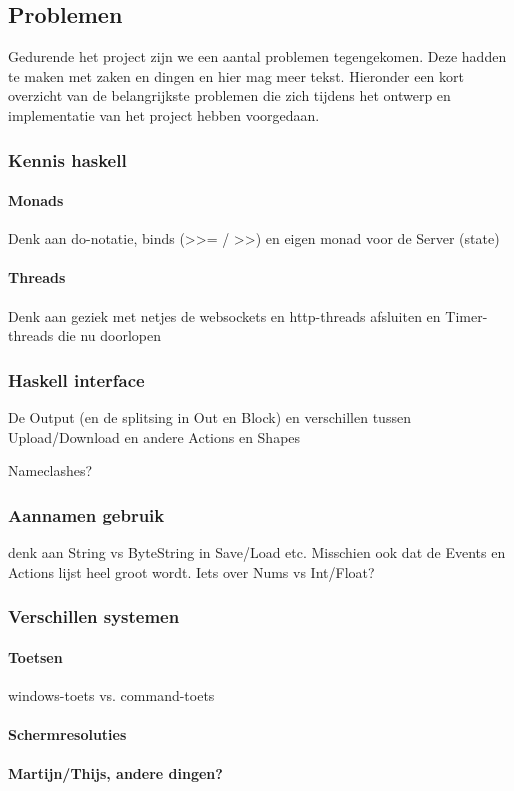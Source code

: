 \subsection{Problemen}

Gedurende het project zijn we een aantal problemen tegengekomen. Deze hadden te maken met zaken en dingen en hier mag meer tekst. Hieronder een kort overzicht van de belangrijkste problemen die zich tijdens het ontwerp en implementatie van het project hebben voorgedaan.

\subsubsection{Kennis haskell}

\paragraph{Monads}
Denk aan do-notatie, binds (>>= / >>) en eigen monad voor de Server (state)

\paragraph{Threads}
Denk aan geziek met netjes de websockets en http-threads afsluiten en Timer-threads die nu doorlopen

\subsubsection{Haskell interface}
De Output (en de splitsing in Out en Block) en verschillen tussen Upload/Download en andere Actions en Shapes

Nameclashes?

\subsubsection{Aannamen gebruik}
denk aan String vs ByteString in Save/Load etc. Misschien ook dat de Events en Actions lijst heel groot wordt. Iets over Nums vs Int/Float?

\subsubsection{Verschillen systemen}

\paragraph{Toetsen}
windows-toets vs. command-toets 

\paragraph{Schermresoluties}

\paragraph{Martijn/Thijs, andere dingen?}
